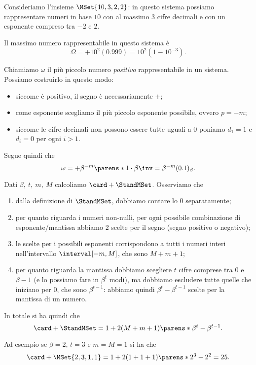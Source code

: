 \begin{example}
    Consideriamo l'insieme $\MSet{10, 3, 2, 2}$: in questo sistema possiamo rappresentare numeri in base $10$ con al massimo $3$ cifre decimali e con un esponente compreso tra $-2$ e $2$. 
    
    Il massimo numero rappresentabile in questo sistema è \[
        \Omega = +10^2(0.999) = 10^2 (1 - 10^{-3}).
    \]
\end{example}

 Chiamiamo $\omega$ il più piccolo numero \emph{positivo} rappresentabile in un sistema. Possiamo costruirlo in questo modo: \begin{itemize}
    \item siccome è positivo, il segno è necessariamente $+$;
    \item come esponente scegliamo il più piccolo esponente possibile, ovvero $p = -m$;
    \item siccome le cifre decimali non possono essere tutte uguali a $0$ poniamo $d_1 = 1$ e $d_i = 0$ per ogni $i > 1$.   
\end{itemize} Segue quindi che \[
    \omega = +\beta^{-m} \parens*{1 \cdot \beta\inv} = \beta^{-m}(0.1)_\beta.
\]

 Dati $\beta,\ t,\ m,\ M$ calcoliamo $\card+{\StandMSet}$. Osserviamo che \begin{enumerate}
    \item dalla definizione di $\StandMSet$, dobbiamo contare lo $0$ separatamente;
    \item per quanto riguarda i numeri non-nulli, per ogni possibile combinazione di esponente/mantissa abbiamo $2$ scelte per il segno (segno positivo o negativo);
    \item le scelte per i possibili esponenti corrispondono a tutti i numeri interi nell'intervallo $\interval[{-m, M}]$, che sono $M + m + 1$;
    \item per quanto riguarda la mantissa dobbiamo scegliere $t$ cifre comprese tra $0$ e $\beta - 1$ (e lo possiamo fare in $\beta^t$ modi), ma dobbiamo escludere tutte quelle che iniziano per $0$, che sono $\beta^{t-1}$: abbiamo quindi $\beta^t - \beta^{t-1}$ scelte per la mantissa di un numero.
\end{enumerate} 
In totale si ha quindi che \[
    \card+{\StandMSet} = 1 + 2(M + m + 1)\parens*{\beta^t - \beta^{t-1}}.
\]

\begin{example}
    Ad esempio se $\beta = 2$, $t = 3$ e $m = M = 1$ si ha che \[
        \card+{\MSet{2, 3, 1, 1}} = 1 + 2(1 + 1 + 1)\parens*{2^3 - 2^2} = 25.
    \]
\end{example}

